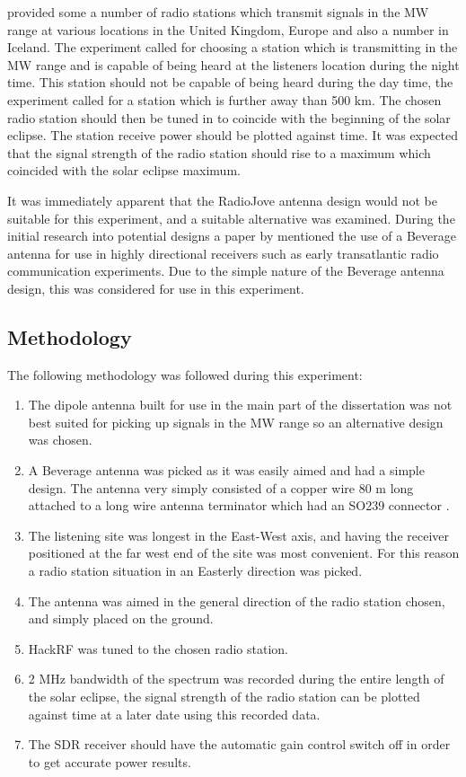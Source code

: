 \documentclass[runningheads,a4paper]{llncs}
\begin{document}
\cite{RSGB-15-b} provided some a number of radio stations which transmit signals in the \gls{MW} range at various locations in the United Kingdom, Europe and also a number in Iceland. The experiment called for choosing a station which is transmitting in the \gls{MW} range and is capable of being heard at the listeners location during the night time. This station should not be capable of being heard during the day time, the experiment called for a station which is further away than 500 km. The chosen radio station should then be tuned in to coincide with the beginning of the solar eclipse. The station receive power should be plotted against time. It was expected that the signal strength of the radio station should rise to a maximum which coincided with the solar eclipse maximum.

It was immediately apparent that the RadioJove antenna design would not be suitable for this experiment, and a suitable alternative was examined. During the initial research into potential designs a paper by \cite{litva-76} mentioned the use of a Beverage antenna for use in highly directional receivers such as early transatlantic radio communication experiments. Due to the simple nature of the Beverage antenna design, this was considered for use in this experiment.


\subsection*{Methodology}
The following methodology was followed during this experiment:

\begin{enumerate}
	\item The dipole antenna built for use in the main part of the dissertation was not best suited for picking up signals in the \gls{MW} range so an alternative design was chosen. 
	\item A Beverage antenna was picked as it was easily aimed and had a simple design. The antenna very simply consisted of a copper wire 80 m long attached to a long wire antenna terminator which had an SO239 connector \citep{litva-76}.
	\item The listening site was longest in the East-West axis, and having the receiver positioned at the far west end of the site was most convenient. For this reason a radio station situation in an Easterly direction was picked.
	\item The antenna was aimed in the general direction of the radio station chosen, and simply placed on the ground.
	\item HackRF was tuned to the chosen radio station.
	\item 2 MHz bandwidth of the spectrum was recorded during the entire length of the solar eclipse, the signal strength of the radio station can be plotted against time at a later date using this recorded data.
	\item The \gls{SDR} receiver should have the automatic gain control switch off in order to get accurate power results. 
\end{enumerate}
\end{document}
